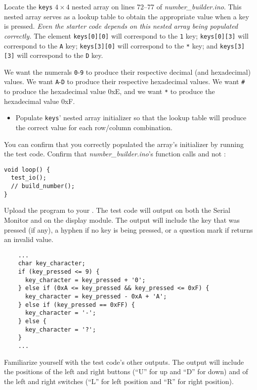 Locate the \lstinline{keys} $4 \times 4$ nested array on lines 72--77 of \textit{number\_builder.ino}.
This nested array serves as a lookup table to obtain the appropriate value when a key is pressed.
\textit{Even the starter code depends on this nested array being populated correctly.}
The element \lstinline{keys[0][0]} will correspond to the \texttt{1} key;
\lstinline{keys[0][3]} will correspond to the \texttt{A} key;
\lstinline{keys[3][0]} will correspond to the \texttt{*} key;
and \lstinline{keys[3][3]} will correspond to the \texttt{D} key.

We want the numerals \texttt{0}-\texttt{9} to produce their respective decimal
(and hexadecimal) values. We want \texttt{A}-\texttt{D} to produce their
respective hexadecimal values. We want \texttt{\#} to produce the hexadecimal
value 0xE, and we want \texttt{*} to produce the hexadecimal value 0xF.

\begin{itemize}
    \item Populate \lstinline{keys}' nested array initializer so that the
        lookup table will produce the correct value for each row/column
        combination.
\end{itemize}

You can confirm that you correctly populated the array's initializer by running the test code.
Confirm that \textit{number\_builder.ino}'s  function calls  and not :

\begin{lstlisting}
void loop() {
  test_io();
  // build_number();
}
\end{lstlisting}

Upload the program to your \developmentboard.
The test code will output on both the Serial Monitor and on the display module.
The output will include the key that was pressed (if any), a hyphen if no key is being pressed, or a question mark if  returns an invalid value.

\begin{lstlisting}
    ...
    char key_character;
    if (key_pressed <= 9) {
      key_character = key_pressed + '0';
    } else if (0xA <= key_pressed && key_pressed <= 0xF) {
      key_character = key_pressed - 0xA + 'A';
    } else if (key_pressed == 0xFF) {
      key_character = '-';
    } else {
      key_character = '?';
    }
    ...
\end{lstlisting}

Familiarize yourself with the test code's other outputs.
The output will include the positions of the left and right buttons (``U'' for up and ``D'' for down) and of the left and right switches (``L'' for left position and ``R'' for right position).


